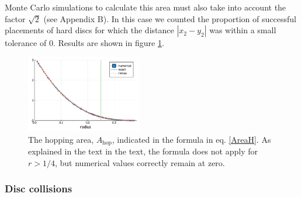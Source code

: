 \documentclass[superscriptaddress,pre,reprint,showpacs,twocolumn]{revtex4-1}
\begin{document}
Monte Carlo simulations to calculate this area must also
take into account the factor $\sqrt{2}$ (see Appendix B).
In this case we counted the proportion of successful placements of hard discs 
for which the distance 
$|x_2 - y_2|$ was within a small tolerance of $0$. 
Results are shown in figure \ref{AreaHopp01}.


\begin{figure}[h]
\centering
\includegraphics[width=0.45\textwidth]{./figures/areaHopvertical01.pdf}
\caption{The hopping area, $A_\text{hop}$, 
  indicated in the formula in eq. \ref{AreaH}. As explained in the text
in the text, the formula does not apply for $r>1/4$, but numerical values correctly
remain at zero.}
\label{AreaHopp01}
\end{figure}


\subsubsection{Disc collisions}
\end{document}
